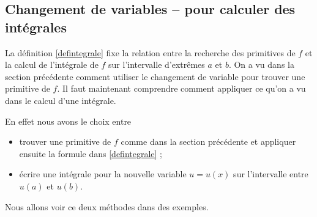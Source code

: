 \subsection{Changement de variables -- pour calculer des intégrales}

La définition \ref{defintegrale} fixe la relation entre la recherche des primitives de $f $ et la calcul de l'intégrale de $f$ sur l'intervalle d'extr\^emes $a$ et $b$. On a vu dans la section précédente comment utiliser le changement de variable pour trouver une primitive de $f$. Il faut maintenant comprendre comment appliquer ce qu'on a vu dans le calcul d'une intégrale. 

En effet nous avons le choix entre 
\begin{itemize}
\item trouver une primitive de $f$ comme dans la section précédente et appliquer ensuite la formule dans \ref{defintegrale} ; 
\item écrire une intégrale pour la nouvelle variable $u = u(x)$ sur l'intervalle entre $u(a)$ et $u(b)$.   
\end{itemize}

Nous allons voir ce deux méthodes dans des exemples. 

